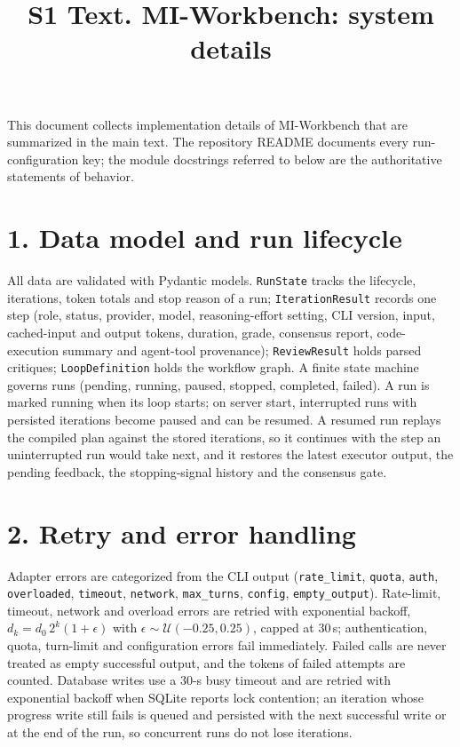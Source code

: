 \documentclass[10pt,letterpaper]{article}
\title{S1 Text. MI-Workbench: system details}
\author{}
\date{}
\begin{document}
\maketitle

This document collects implementation details of MI-Workbench that are summarized in the main text. The repository README documents every run-configuration key; the module docstrings referred to below are the authoritative statements of behavior.

\section*{1. Data model and run lifecycle}

All data are validated with Pydantic models. \texttt{RunState} tracks the lifecycle, iterations, token totals and stop reason of a run; \texttt{IterationResult} records one step (role, status, provider, model, reasoning-effort setting, CLI version, input, cached-input and output tokens, duration, grade, consensus report, code-execution summary and agent-tool provenance); \texttt{ReviewResult} holds parsed critiques; \texttt{LoopDefinition} holds the workflow graph. A finite state machine governs runs (pending, running, paused, stopped, completed, failed). A run is marked running when its loop starts; on server start, interrupted runs with persisted iterations become paused and can be resumed. A resumed run replays the compiled plan against the stored iterations, so it continues with the step an uninterrupted run would take next, and it restores the latest executor output, the pending feedback, the stopping-signal history and the consensus gate.

\section*{2. Retry and error handling}

Adapter errors are categorized from the CLI output (\texttt{rate\_limit}, \texttt{quota}, \texttt{auth}, \texttt{overloaded}, \texttt{timeout}, \texttt{network}, \texttt{max\_turns}, \texttt{config}, \texttt{empty\_output}). Rate-limit, timeout, network and overload errors are retried with exponential backoff, $d_k = d_0\,2^k(1+\epsilon)$ with $\epsilon\sim\mathcal{U}(-0.25,0.25)$, capped at 30\,s; authentication, quota, turn-limit and configuration errors fail immediately. Failed calls are never treated as empty successful output, and the tokens of failed attempts are counted. Database writes use a 30-s busy timeout and are retried with exponential backoff when SQLite reports lock contention; an iteration whose progress write still fails is queued and persisted with the next successful write or at the end of the run, so concurrent runs do not lose iterations.
\end{document}
